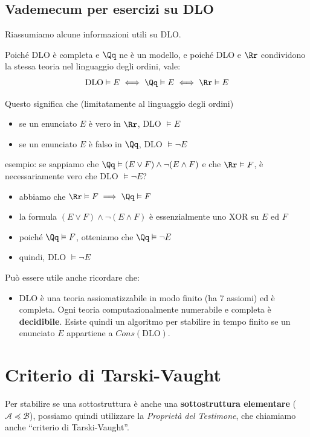\documentclass[a4paper,11pt]{report}
\begin{document}
\subsection*{Vademecum per esercizi su DLO}
Riassumiamo alcune informazioni utili su DLO.

Poiché DLO è completa e \( \Qq \) ne è un modello, e poiché DLO e \( \Rr \) condividono la stessa teoria nel linguaggio degli ordini, vale:
\[ \text{DLO} \vDash E \iff \Qq \vDash E \iff \Rr \vDash E \]

Questo significa che (limitatamente al linguaggio degli ordini)
\begin{itemize}
    \item se un enunciato \( E \) è vero in \( \Rr \), DLO \(\vDash E  \)
    \item se un enunciato \( E \) è falso in \( \Qq \), DLO \( \vDash \neg E \)
\end{itemize}

\vspace{0.5em}
{\color{CadetBlue}esempio: 
se sappiamo che \( \Qq \vDash (E \lor F)\land \neg(E \land F) \) e che \( \Rr \vDash F \), è necessariamente vero che DLO \( \vDash \neg E \)?
\begin{itemize}
    \item abbiamo che \( \Rr \vDash F \implies \Qq \vDash F \)
    \item la formula \(  (E \lor F)\land \neg(E \land F)  \) è essenzialmente uno XOR su \( E \) ed \( F \)
    \item poiché \( \Qq \vDash F \), otteniamo che \( \Qq \vDash \neg E \)
    \item  quindi, DLO \(\vDash \neg E\)
\end{itemize}
}

Può essere utile anche ricordare che:
\begin{itemize}
    \item DLO è una teoria assiomatizzabile in modo finito (ha 7 assiomi) ed è completa. Ogni teoria computazionalmente numerabile e completa è \textbf{decidibile}. Esiste quindi un algoritmo per stabilire in tempo finito se un enunciato \(E\) appartiene a \(Cons(\text{DLO})\).
\end{itemize}

\section{Criterio di Tarski-Vaught}
\label{criterio-tarski}

Per stabilire se una sottostruttura è anche una \textbf{sottostruttura elementare} (\(\mathcal{A} \preceq \mathcal{B}\)), possiamo quindi utilizzare la \textit{Proprietà del Testimone}, che chiamiamo anche ``criterio di Tarski-Vaught''.
\end{document}
